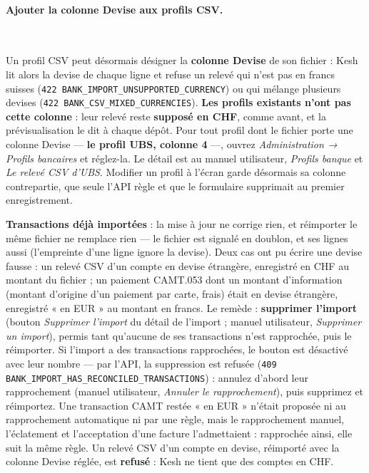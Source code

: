 \documentclass[a4paper,11pt,oneside]{article}
\begin{document}
\paragraph{Ajouter la colonne Devise aux profils CSV.}\mbox{}\\
\begin{sloppypar}
Un profil CSV peut désormais désigner la \textbf{colonne Devise} de son fichier : Kesh lit alors la devise de chaque ligne et refuse un relevé qui n'est pas en francs suisses (\texttt{422 BANK\_IMPORT\_UNSUPPORTED\_CURRENCY}) ou qui mélange plusieurs devises (\texttt{422 BANK\_CSV\_MIXED\_CURRENCIES}). \textbf{Les profils existants n'ont pas cette colonne} : leur relevé reste \textbf{supposé en CHF}, comme avant, et la prévisualisation le dit à chaque dépôt. Pour tout profil dont le fichier porte une colonne Devise --- \textbf{le profil UBS, colonne 4} ---, ouvrez \emph{Administration → Profils bancaires} et réglez-la. Le détail est au manuel utilisateur, \emph{Profils banque} et \emph{Le relevé CSV d'UBS}. Modifier un profil à l'écran garde désormais sa colonne contrepartie, que seule l'API règle et que le formulaire supprimait au premier enregistrement.
\end{sloppypar}

\textbf{Transactions déjà importées} : la mise à jour ne corrige rien, et réimporter le même fichier ne remplace rien --- le fichier est signalé en doublon, et ses lignes aussi (l'empreinte d'une ligne ignore la devise). Deux cas ont pu écrire une devise fausse : un relevé CSV d'un compte en devise étrangère, enregistré en CHF au montant du fichier ; un paiement CAMT.053 dont un montant d'information (montant d'origine d'un paiement par carte, frais) était en devise étrangère, enregistré « en EUR » au montant en francs. Le remède : \textbf{supprimer l'import} (bouton \emph{Supprimer l'import} du détail de l'import ; manuel utilisateur, \emph{Supprimer un import}), permis tant qu'aucune de ses transactions n'est rapprochée, puis le réimporter. Si l'import a des transactions rapprochées, le bouton est désactivé avec leur nombre --- par l'API, la suppression est refusée (\texttt{409 BANK\_IMPORT\_HAS\_RECONCILED\_TRANSACTIONS}) : annulez d'abord leur rapprochement (manuel utilisateur, \emph{Annuler le rapprochement}), puis supprimez et réimportez. Une transaction CAMT restée « en EUR » n'était proposée ni au rapprochement automatique ni par une règle, mais le rapprochement manuel, l'éclatement et l'acceptation d'une facture l'admettaient : rapprochée ainsi, elle suit la même règle. Un relevé CSV d'un compte en devise, réimporté avec la colonne Devise réglée, est \textbf{refusé} : Kesh ne tient que des comptes en CHF.
\end{document}
